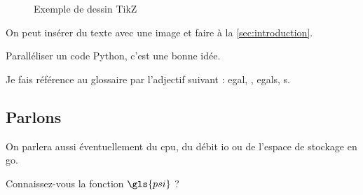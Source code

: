 




\begin{figure}[!h]
\begin{center}
\resizebox{\textwidth}{!}{%

}%
\caption{Exemple de dessin TikZ}
\label{fig:dummy}
\end{center}
\end{figure}

On peut insérer du texte avec une image  et faire à la \autoref{sec:introduction}.

Paralléliser un code Python, c'est une bonne idée. \cite{mpi4py}

Je fais référence au glossaire par l'adjectif suivant : \gls{egal}, , \glspl{egal}, s.


\subsection{Parlons }\label{ssec:dummy_cpu}

On parlera aussi éventuellement du \gls{cpu}, du débit \acrshort{io} ou de l'espace de stockage en \acrlong{go}.

Connaissez-vous la fonction \( \gls{psi} \) ?
